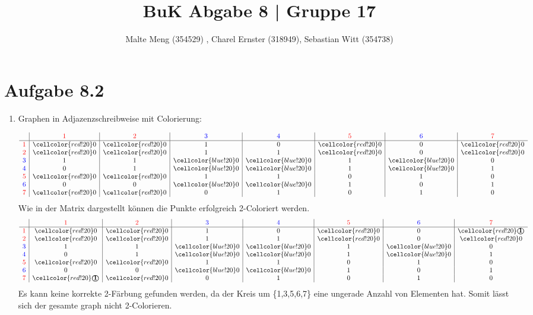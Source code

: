 \documentclass{article}
\title{BuK Abgabe 8 | Gruppe 17}
\author{Malte Meng (354529) , Charel Ernster (318949), Sebastian Witt (354738)}
\newcommand{\rt}{\color{red}}
\newcommand{\bt}{\color{blue}}
\newcommand{\rc}{\cellcolor{red!20}}
\newcommand{\bc}{\cellcolor{blue!20}}
\begin{document}
	\maketitle 
	\section[a 8.2]{Aufgabe 8.2}
	\begin{enumerate}[label=(\alph*).]
		\item Graphen in Adjazenzschreibweise mit Colorierung:
		
		\begin{equation}
			\begin{array}{l | c | c | c | c | c | c | c}
				\ & \rt1 &  \rt2 & \bt3 & \bt4 & \rt5 & \bt6 & \rt7\\
				\hline
				\rt1& \rc0 & \rc0 & 1 & 0 & \rc0 & 0 & \rc0\\
				\rt2& \rc0 & \rc0 & 1 & 1 & \rc0 & 0 & \rc0\\
				\bt3& 1 & 1 & \bc0 & \bc0 & 1 & \bc0 & 0\\
				\bt4& 0 & 1 & \bc0 & \bc0 & 1 & \bc0 & 1\\
				\rt5& \rc0 & \rc0 & 1 & 1 & 0 & 1 & 0\\
				\bt6& 0 & 0 & \bc0 & \bc0 & 1 & 0 & 1\\
				\rt7& \rc0 & \rc0 & 0 & 1 & 0 & 1 & 0\\
			\end{array}
		\end{equation}
		Wie in der Matrix dargestellt können die Punkte erfolgreich 2-Coloriert werden.
		\begin{equation}
			\begin{array}{l | c | c | c | c | c | c | c}
				 & \rt1 &  \rt2 & \bt3 & \bt4 & \rt5 & \bt6 & \rt7\\
				\hline
				\rt1& \rc0 & \rc0 & 1 & 0 & \rc0 & 0 & \rc\textbf{\textcircled{1}}\\
				\rt2& \rc0 & \rc0 & 1 & 1 & \rc0 & 0 & \rc0\\
				\bt3& 1 & 1 & \bc0 & \bc0 & 1 & \bc0 & 0\\
				\bt4& 0 & 1 & \bc0 & \bc0 & 1 & \bc0 & 1\\
				\rt5& \rc0 & \rc0 & 1 & 1 & 0 & 1 & 0\\
				\bt6& 0 & 0 & \bc0 & \bc0 & 1 & 0 & 1\\
				\rt7& \rc\textbf{\textcircled{1}} & \rc0 & 0 & 1 & 0 & 1 & 0\\
			\end{array}
		\end{equation}
		Es kann keine korrekte 2-Färbung gefunden werden, da der Kreis um \{1,3,5,6,7\} eine ungerade Anzahl von Elementen hat. Somit lässt sich der gesamte graph nicht 2-Colorieren.
		

\end{enumerate}
\end{document}
